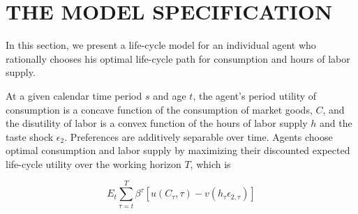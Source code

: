 \documentclass{article}
\begin{document}
\section{THE MODEL SPECIFICATION}
\label{section:model}
In this section, we present a life-cycle model for an individual agent who rationally chooses his optimal life-cycle path for consumption and hours of labor supply. \par
At a given calendar time period $s$ and age $t$, the agent's period utility of consumption is a concave function of the consumption of market goods, $C$, and the disutility of labor is a convex function of the hours of labor supply $h$ and the taste shock $\epsilon_2$. Preferences are additively separable over time. Agents choose optimal consumption and labor supply by maximizing their discounted expected life-cycle
utility over the working horizon $T$, which is

\begin{equation} \tag{1}
E_t \sum_{\tau=t}^T \beta^{\tau} [u(C_{\tau} , \tau) - v(h_{\tau} \epsilon_{2,\tau})]
\end{equation}
\end{document}
